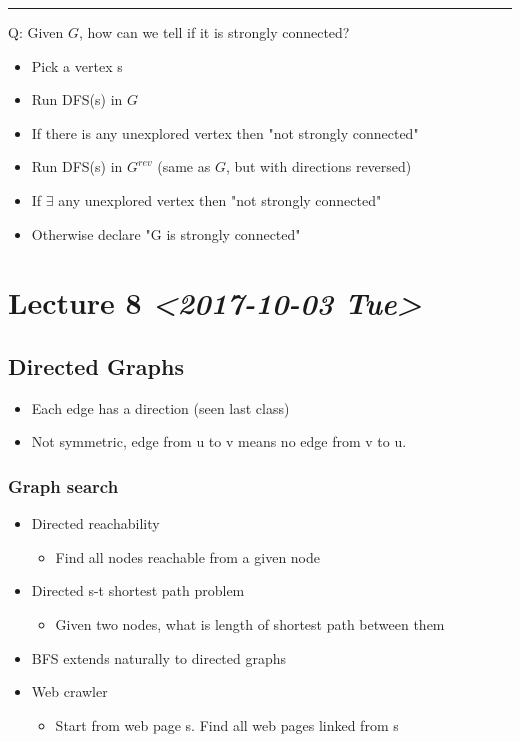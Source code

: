 \documentclass[11pt]{article}
\begin{document}
\noindent\rule{\textwidth}{0.5pt}
Q: Given \(G\), how can we tell if it is strongly connected?
\begin{itemize}
\item Pick a vertex s
\item Run DFS(s) in \(G\)
\item If there is any unexplored vertex then "not strongly connected"
\item Run DFS(s) in \(G^{rev}\) (same as \(G\), but with directions reversed)
\item If \(\exists\) any unexplored vertex then "not strongly connected"
\item Otherwise declare "G is strongly connected"
\end{itemize}
\section{Lecture 8 \textit{<2017-10-03 Tue>}}
\label{sec:orgcdf1b57}
\subsection{Directed Graphs}
\label{sec:orga7fa293}
\begin{itemize}
\item Each edge has a direction (seen last class)
\item Not symmetric, edge from u to v means no edge from v to u.
\end{itemize}
\subsubsection{Graph search}
\label{sec:org0d2de13}
\begin{itemize}
\item Directed reachability
\begin{itemize}
\item Find all nodes reachable from a given node
\end{itemize}
\item Directed s-t shortest path problem
\begin{itemize}
\item Given two nodes, what is length of shortest path between them
\end{itemize}
\item BFS extends naturally to directed graphs
\item Web crawler
\begin{itemize}
\item Start from web page s. Find all web pages linked from s
\end{itemize}
\end{itemize}
\end{document}
